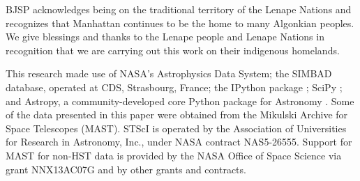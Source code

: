 \documentclass[modern]{aastex62}
\begin{document}
BJSP acknowledges being on the traditional territory of the Lenape Nations and recognizes that Manhattan continues to be the home to many Algonkian peoples. We give blessings and thanks to the Lenape people and Lenape Nations in recognition that we are carrying out this work on their indigenous homelands.
%

This research made use of NASA's Astrophysics Data System; the SIMBAD database, operated at CDS, Strasbourg, France; the IPython package \citep{PER-GRA:2007}; SciPy \citep{scipy}; and Astropy, a community-developed core Python package for Astronomy \citep{astropy}. Some of the data presented in this paper were obtained from the Mikulski Archive for Space Telescopes (MAST). STScI is operated by the Association of Universities for Research in Astronomy, Inc., under NASA contract NAS5-26555. Support for MAST for non-HST data is provided by the NASA Office of Space Science via grant NNX13AC07G and by other grants and contracts. 








\end{document}
